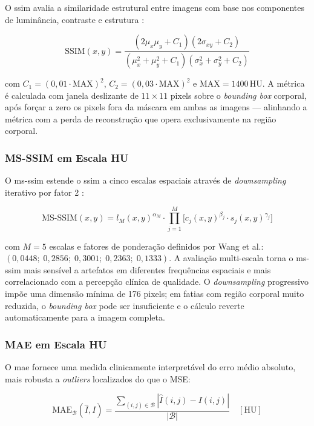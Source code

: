 O \acrfull{ssim} avalia a similaridade estrutural entre imagens com base nos componentes de luminância, contraste e estrutura \cite{zhouwangImageQualityAssessment2004}:

\[
\text{SSIM}(x,y) = \frac{(2\mu_x\mu_y + C_1)(2\sigma_{xy} + C_2)}{(\mu_x^2 + \mu_y^2 + C_1)(\sigma_x^2 + \sigma_y^2 + C_2)}
\]

\noindent com $C_1 = (0{,}01 \cdot \mathrm{MAX})^2$, $C_2 = (0{,}03 \cdot \mathrm{MAX})^2$ e $\mathrm{MAX} = 1400\,\text{HU}$. A métrica é calculada com janela deslizante de $11 \times 11$ pixels sobre o \textit{bounding box} corporal, após forçar a zero os pixels fora da máscara em ambas as imagens — alinhando a métrica com a perda de reconstrução que opera exclusivamente na região corporal.

\subsubsection{MS-SSIM em Escala HU}

O \acrfull{ms-ssim} estende o \acrshort{ssim} a cinco escalas espaciais através de \textit{downsampling} iterativo por fator 2 \cite{wangMultiscaleStructuralSimilarity2003a}:

\[
\text{MS-SSIM}(x,y) = l_M(x,y)^{\alpha_M} \cdot \prod_{j=1}^{M} \bigl[c_j(x,y)^{\beta_j} \cdot s_j(x,y)^{\gamma_j}\bigr]
\]

\noindent com $M = 5$ escalas e fatores de ponderação definidos por Wang et al.: $(0{,}0448;\; 0{,}2856;\; 0{,}3001;\; 0{,}2363;\; 0{,}1333)$. A avaliação multi-escala torna o \acrshort{ms-ssim} mais sensível a artefatos em diferentes frequências espaciais e mais correlacionado com a percepção clínica de qualidade. O \textit{downsampling} progressivo impõe uma dimensão mínima de 176 pixels; em fatias com região corporal muito reduzida, o \textit{bounding box} pode ser insuficiente e o cálculo reverte automaticamente para a imagem completa.

\subsubsection{MAE em Escala HU}

O \acrfull{mae} fornece uma medida clinicamente interpretável do erro médio absoluto, mais robusta a \textit{outliers} localizados do que o MSE:

\[
\mathrm{MAE}_{\mathcal{B}}(\hat{I}, I) = \frac{\displaystyle\sum_{(i,j)\in\mathcal{B}} |\hat{I}(i,j) - I(i,j)|}{|\mathcal{B}|} \quad [\text{HU}]
\]

